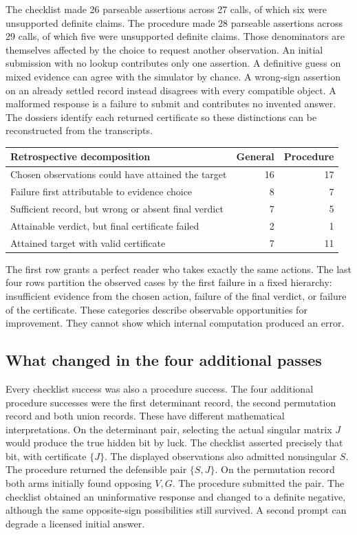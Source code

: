 \documentclass[12pt,letterpaper]{article}
\begin{document}
The checklist made 26 parseable assertions across 27 calls, of which six were unsupported definite claims. The procedure made 28 parseable assertions across 29 calls, of which five were unsupported definite claims. Those denominators are themselves affected by the choice to request another observation. An initial submission with no lookup contributes only one assertion. A definitive guess on mixed evidence can agree with the simulator by chance. A wrong-sign assertion on an already settled record instead disagrees with every compatible object. A malformed response is a failure to submit and contributes no invented answer. The dossiers identify each returned certificate so these distinctions can be reconstructed from the transcripts.

\begin{center}\footnotesize\setlength{\tabcolsep}{4pt}\begin{tabularx}{\linewidth}{Yrr}\toprule
Retrospective decomposition & General & Procedure\\\midrule
Chosen observations could have attained the target & 16 & 17\\
Failure first attributable to evidence choice & 8 & 7\\
Sufficient record, but wrong or absent final verdict & 7 & 5\\
Attainable verdict, but final certificate failed & 2 & 1\\
Attained target with valid certificate & 7 & 11\\
\bottomrule\end{tabularx}\end{center}


The first row grants a perfect reader who takes exactly the same actions. The last four rows partition the observed cases by the first failure in a fixed hierarchy: insufficient evidence from the chosen action, failure of the final verdict, or failure of the certificate. These categories describe observable opportunities for improvement. They cannot show which internal computation produced an error.

\subsection{What changed in the four additional passes}

Every checklist success was also a procedure success. The four additional procedure successes were the first determinant record, the second permutation record and both union records. These have different mathematical interpretations. On the determinant pair, selecting the actual singular matrix $J$ would produce the true hidden bit by luck. The checklist asserted precisely that bit, with certificate $\{J\}$. The displayed observations also admitted nonsingular $S$. The procedure returned the defensible pair $\{S,J\}$. On the permutation record both arms initially found opposing $V,G$. The procedure submitted the pair. The checklist obtained an uninformative response and changed to a definite negative, although the same opposite-sign possibilities still survived. A second prompt can degrade a licensed initial answer.
\end{document}
